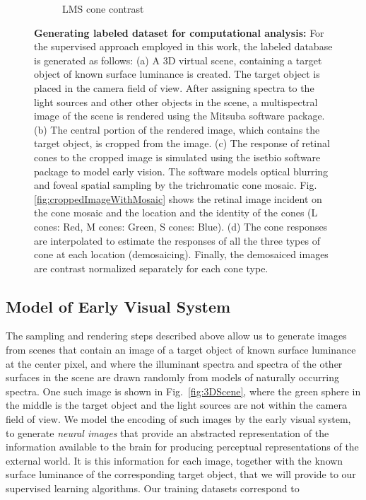 \documentclass{jov}
\begin{document}
\begin{figure}
\begin{subfigure}[b]{0.2 \textwidth}
        \caption{LMS cone contrast}
        \label{fig:coneContrast}
    \end{subfigure}
    \label{fig:sceneWithCroppedImage}
    \caption{{\bf Generating labeled dataset for computational analysis:}  For the supervised approach employed in this work, the labeled database is generated as follows: (a) A 3D virtual scene, containing a target object of known surface luminance is created. The target object is placed in the camera field of view. After assigning spectra to the light sources and other other objects in the scene, a multispectral image of the scene is rendered using the Mitsuba software package. (b) The central portion of the rendered image, which contains the target object, is cropped from the image. (c) The response of retinal cones to the cropped image is simulated using the isetbio software package to model early vision. The software models optical blurring and foveal spatial sampling by the trichromatic cone mosaic. Fig.\ref{fig:croppedImageWithMosaic} shows the retinal image incident on the cone mosaic and the location and the identity of the cones (L cones: Red, M cones: Green, S cones: Blue).  (d) The cone responses are interpolated to estimate the responses of all the three types of cone at each location (demosaicing). Finally, the demosaiced images are contrast normalized separately for each cone type.}
\end{figure}

\subsection{Model of Early Visual System} \label{method:Isetbio}

The sampling and rendering steps described above allow us to generate images from scenes that contain an image of a target object of known surface luminance at the center pixel, and where the illuminant spectra and spectra of the other surfaces in the scene are drawn randomly from models of naturally occurring spectra.  One such image is shown in Fig.~\ref{fig:3DScene}, where the green sphere in the middle is the target object and the light sources are not within the camera field of view. We model the encoding of such images by the early visual system, to generate {\em neural images} that provide an abstracted representation of the information available to the brain for producing perceptual representations of the external world.  It is this information for each image, together with the known surface luminance of the corresponding target object, that we will provide to our supervised learning algorithms.  Our training datasets correspond to %
\end{document}
